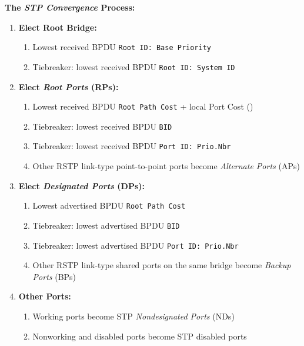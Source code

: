 \documentclass[12pt]{article}
\begin{document}
	\textbf{The \textit{STP Convergence} Process:}
	\begin{enumerate}[leftmargin=*]
		\label{itm:STP CONVERGENCE}
		\item{\textbf{Elect Root Bridge:}}
		\begin{enumerate}[leftmargin=*, itemsep=-5pt]
			\item{Lowest received BPDU \texttt{Root ID: Base Priority}}
			\item{Tiebreaker: lowest received BPDU \texttt{Root ID: System ID}}
		\end{enumerate}
		\item{\textbf{Elect \textit{Root Ports} (RPs):}}
		\begin{enumerate}[leftmargin=*, itemsep=-5pt]
			\item{Lowest received BPDU \texttt{Root Path Cost} + local Port Cost ()}
			\item{Tiebreaker: lowest received BPDU \texttt{BID}}
			\item{Tiebreaker: lowest received BPDU \texttt{Port ID: Prio.Nbr}}
			\item{Other RSTP link-type point-to-point ports become \textit{Alternate Ports} (APs)}
		\end{enumerate}
		\item{\textbf{Elect \textit{Designated Ports} (DPs):}}
		\begin{enumerate}[leftmargin=*, itemsep=-5pt]
			\item{Lowest advertised BPDU \texttt{Root Path Cost}}
			\item{Tiebreaker: lowest advertised BPDU \texttt{BID}}
			\item{Tiebreaker: lowest advertised BPDU \texttt{Port ID: Prio.Nbr}}
			\item{Other RSTP link-type shared ports on the same bridge become \textit{Backup Ports} (BPs)}
		\end{enumerate}
		\item{\textbf{Other Ports:}}
		\begin{enumerate}[leftmargin=*, itemsep=-5pt]
			\item{Working ports become STP \textit{Nondesignated Ports} (NDs)}
			\item{Nonworking and disabled ports become STP disabled ports}
		\end{enumerate}
	\end{enumerate}
\end{document}
